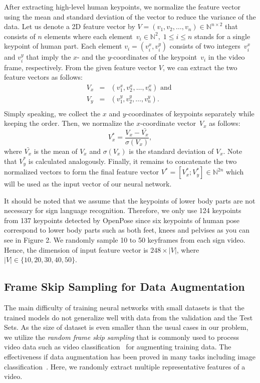 \documentclass[10pt,twocolumn,letterpaper]{article}
\begin{document}
After extracting high-level human keypoints, we normalize the feature vector using the mean and standard deviation of the vector to reduce the variance of the data. Let us denote a 2D feature vector by $V = (v_1, v_2, \ldots, v_n) \in \mathbb{N}^{n\times2}$ that consists of $n$ elements where each element~$v_i \in \mathbb{N}^2,\;1 \le i \le n$ stands for a single keypoint of human part. Each element $v_i = (v_i^x, v_i^y)$ consists of two integers~$v_i^x$ and $v_i^y$ that imply the $x$- and the $y$-coordinates of the keypoint~$v_i$ in the video frame, respectively. From the given feature vector $V$, we can extract the two feature vectors as follows:
\[
\begin{array}{lcl}
V_x & = & (v_1^x, v_2^x, \ldots, v_n^x)\textrm{ and } \\
V_y & = & (v_1^y, v_2^y, \ldots, v_n^y).\\
\end{array}
\]
Simply speaking, we collect the $x$ and $y$-coordinates of keypoints separately while keeping the order. Then, we normalize the $x$-coordinate vector~$V_x$ as follows:
\[
V_x^* = \frac{V_x - \bar{V_x}}{\sigma(V_x)},
\]
where $\bar{V_x}$ is the mean of $V_x$ and $\sigma(V_x)$ is the standard deviation of $V_x$.
Note that $V_y^*$ is calculated analogously.
Finally, it remains to concatenate the two normalized vectors to form the
final feature vector $V^* = [V_x^*; V_y^*] \in \mathbb{N}^{2n}$ which will
be used as the input vector of our neural network.


It should be noted that we assume that the keypoints of lower body parts are not necessary for sign language recognition. Therefore, we only use 124 keypoints from 137 keypoints detected by OpenPose since six keypoints of human pose correspond to lower body parts such as both feet, knees and pelvises as you can see in Figure 2. We randomly sample 10 to 50 keyframes from each sign video. Hence, the dimension of input feature vector is $248 \times |V|$, where $|V| \in \{ 10, 20, 30, 40, 50\}$.

\subsection{Frame Skip Sampling for Data Augmentation}

The main difficulty of training neural networks with small datasets is that
the trained models do not generalize well with data from the validation and
the Test Sets. As the size of dataset is even smaller than the usual cases
in our problem, we utilize the {\em random frame skip sampling} that is commonly used to
process video data such as video classification~\cite{KarpathyTSLSF14} for augmenting
training data. The effectiveness if data augmentation has been proved in
many tasks including image classification~\cite{PerezW17}. Here, we randomly extract multiple representative features of a video.
\end{document}
